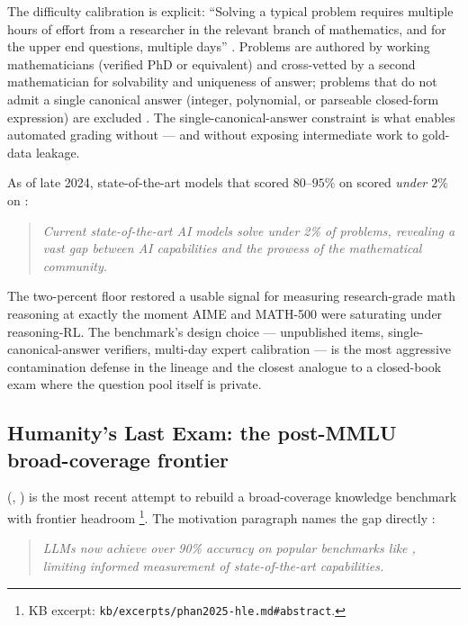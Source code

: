 The difficulty calibration is explicit: ``Solving a typical problem
requires multiple hours of effort from a researcher in the relevant
branch of mathematics, and for the upper end questions, multiple days''
\citep[\S{}sec-difficulty]{glazer2024-frontiermath}. Problems are
authored by working mathematicians (verified PhD or equivalent) and
cross-vetted by a second mathematician for solvability and uniqueness
of answer; problems that do not admit a single canonical answer
(integer, polynomial, or parseable closed-form expression) are
excluded \citep[\S{}sec-verification]{glazer2024-frontiermath}. The
single-canonical-answer constraint is what enables automated grading
without  --- and without exposing intermediate work to
gold-data leakage.

As of late 2024,
state-of-the-art models that scored $80\text{--}95\%$ on  scored
\emph{under $2\%$} on  \citep[\S{}sec-launch-result,\S{}abstract]{glazer2024-frontiermath}:

\begin{quote}\itshape
Current state-of-the-art AI models solve under 2\% of problems,
revealing a vast gap between AI capabilities and the prowess of the
mathematical community.
\end{quote}

The two-percent floor restored a usable signal for measuring
research-grade math reasoning at exactly the moment AIME and MATH-500
were saturating under reasoning-RL. The benchmark's design choice ---
unpublished items, single-canonical-answer verifiers, multi-day
expert calibration --- is the most aggressive contamination defense in
the lineage and the closest analogue to a closed-book exam where the
question pool itself is private.

\subsection{Humanity's Last Exam: the post-MMLU broad-coverage frontier}
\label{sec:knowledge-hle}

\citet{phan2025-hle} (, ) is the most recent
attempt to rebuild a broad-coverage knowledge benchmark with frontier
headroom%
\footnote{KB excerpt: \nolinkurl{kb/excerpts/phan2025-hle.md#abstract}.}.
The motivation paragraph names the gap directly
\citep[\S{}abstract]{phan2025-hle}:

\begin{quote}\itshape
LLMs now achieve over 90\% accuracy on popular benchmarks like ,
limiting informed measurement of state-of-the-art  capabilities.
\end{quote}

